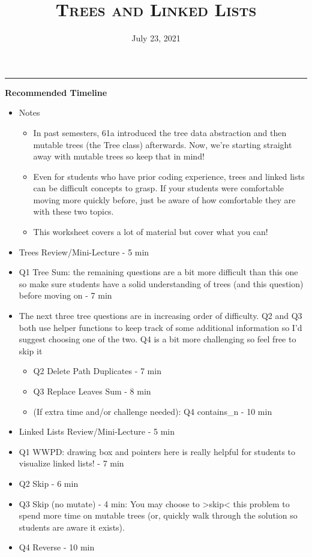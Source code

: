 \documentclass{exam}
\title{\textsc{Trees and Linked Lists}}
\date{July 23, 2021}
\begin{document}
\maketitle
\rule{\textwidth}{0.15em}
\fontsize{12}{15}\selectfont

\begin{guide}
\textbf{Recommended Timeline}
\begin{itemize}
    \item Notes
    \begin{itemize}
        \item In past semesters, 61a introduced the tree data abstraction and then mutable trees 
        (the Tree class) afterwards. Now, we're starting straight away with mutable trees so keep that in mind!
        \item Even for students who have prior coding experience, trees and linked lists can be difficult concepts
        to grasp. If your students were comfortable moving more quickly before, just be aware of how comfortable they are 
        with these two topics.
        \item This worksheet covers a lot of material but cover what you can!
    \end{itemize}
    \item Trees Review/Mini-Lecture - 5 min
    \item Q1 Tree Sum: the remaining questions are a bit more difficult than this one so make sure students have
    a solid understanding of trees (and this question) before moving on - 7 min
    \item The next three tree questions are in increasing order of difficulty.
    Q2 and Q3 both use helper functions to keep track of some additional information so I'd suggest choosing one of the two.
    Q4 is a bit more challenging so feel free to skip it
    \begin{itemize}
        \item Q2 Delete Path Duplicates - 7 min
        \item Q3 Replace Leaves Sum - 8 min
        \item (If extra time and/or challenge needed): Q4 contains\_n - 10 min
    \end{itemize}
    \item Linked Lists Review/Mini-Lecture - 5 min
    \item Q1 WWPD: drawing box and pointers here is really helpful for students to visualize linked lists! - 7 min
    \item Q2 Skip - 6 min
    \item Q3 Skip (no mutate) - 4 min: You may choose to >skip< this problem to spend more time on mutable trees (or, quickly walk through the solution so students are aware it exists).
    \item Q4 Reverse - 10 min
\end{itemize}
\end{guide}
\end{document}
